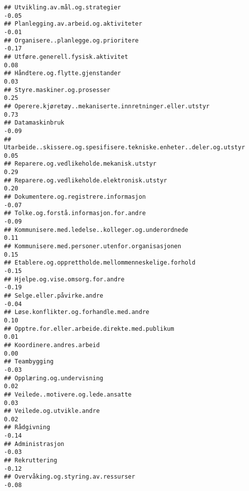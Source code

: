 \documentclass[
]{article}
\begin{document}
\begin{verbatim}
## Utvikling.av.mål.og.strategier                                                   -0.05
## Planlegging.av.arbeid.og.aktiviteter                                             -0.01
## Organisere..planlegge.og.prioritere                                              -0.17
## Utføre.generell.fysisk.aktivitet                                                  0.08
## Håndtere.og.flytte.gjenstander                                                    0.03
## Styre.maskiner.og.prosesser                                                       0.25
## Operere.kjøretøy..mekaniserte.innretninger.eller.utstyr                           0.73
## Datamaskinbruk                                                                   -0.09
## Utarbeide..skissere.og.spesifisere.tekniske.enheter..deler.og.utstyr              0.05
## Reparere.og.vedlikeholde.mekanisk.utstyr                                          0.29
## Reparere.og.vedlikeholde.elektronisk.utstyr                                       0.20
## Dokumentere.og.registrere.informasjon                                            -0.07
## Tolke.og.forstå.informasjon.for.andre                                            -0.09
## Kommunisere.med.ledelse..kolleger.og.underordnede                                 0.11
## Kommunisere.med.personer.utenfor.organisasjonen                                   0.15
## Etablere.og.opprettholde.mellommenneskelige.forhold                              -0.15
## Hjelpe.og.vise.omsorg.for.andre                                                  -0.19
## Selge.eller.påvirke.andre                                                        -0.04
## Løse.konflikter.og.forhandle.med.andre                                            0.10
## Opptre.for.eller.arbeide.direkte.med.publikum                                     0.01
## Koordinere.andres.arbeid                                                          0.00
## Teambygging                                                                      -0.03
## Opplæring.og.undervisning                                                         0.02
## Veilede..motivere.og.lede.ansatte                                                 0.03
## Veilede.og.utvikle.andre                                                          0.02
## Rådgivning                                                                       -0.14
## Administrasjon                                                                   -0.03
## Rekruttering                                                                     -0.12
## Overvåking.og.styring.av.ressurser                                               -0.08

\end{verbatim}
\end{document}
